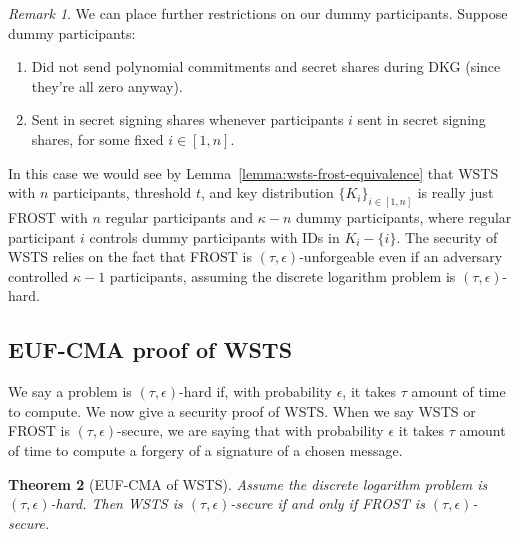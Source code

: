 \documentclass{article}
\newtheorem{thm}{Theorem}[section]
\theoremstyle{definition}
\theoremstyle{remark}
\newtheorem{rem}[thm]{Remark}
\begin{document}
\begin{rem}
    We can place further restrictions on our dummy participants. Suppose dummy participants:
    \begin{enumerate}
        \item Did not send polynomial commitments and secret shares during DKG (since they're all zero anyway).
        \item Sent in secret signing shares whenever participants $i$ sent in secret signing shares, for some fixed $i \in [1, n]$.
    \end{enumerate}
    In this case we would see by Lemma~\ref{lemma:wsts-frost-equivalence} that WSTS with $n$ participants, threshold $t$, and key distribution $\{K_i\}_{i\in [1,n]}$ is really just FROST with $n$ regular participants and $\kappa - n$ dummy participants, where regular participant $i$ controls dummy participants with IDs in $K_i - \{ i\}$. The security of WSTS relies on the fact that FROST is $(\tau, \epsilon)$-unforgeable even if an adversary controlled $\kappa - 1$ participants, assuming the discrete logarithm problem is $(\tau, \epsilon)$-hard. 
\end{rem}

\subsection{EUF-CMA proof of WSTS}

We say a problem is $(\tau, \epsilon)$-hard if, with probability $\epsilon$, it takes $\tau$ amount of time to compute. We now give a security proof of WSTS. When we say WSTS or FROST is $(\tau, \epsilon)$-secure, we are saying that with probability $\epsilon$ it takes $\tau$ amount of time to compute a forgery of a signature of a chosen message.

\begin{thm}[EUF-CMA of WSTS]
    Assume the discrete logarithm problem is $(\tau, \epsilon)$-hard. Then WSTS is $(\tau, \epsilon)$-secure if and only if FROST is $(\tau, \epsilon)$-secure.
\end{thm}
\end{document}
